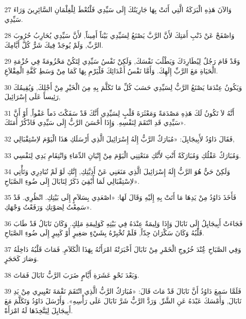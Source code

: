 \par 27 وَالآنَ هَذِهِ الْبَرَكَةُ الَّتِي أَتَتْ بِهَا جَارِيَتُكَ إِلَى سَيِّدِي فَلْتُعْطَ لِلْغِلْمَانِ السَّائِرِينَ وَرَاءَ سَيِّدِي.
\par 28 وَاصْفَحْ عَنْ ذَنْبِ أَمَتِكَ لأَنَّ الرَّبَّ يَصْنَعُ لِسَيِّدِي بَيْتاً أَمِيناً, لأَنَّ سَيِّدِي يُحَارِبُ حُرُوبَ الرَّبِّ, وَلَمْ يُوجَدْ فِيكَ شَرٌّ كُلَّ أَيَّامِكَ.
\par 29 وَقَدْ قَامَ رَجُلٌ لِيُطَارِدَكَ وَيَطْلُبَ نَفْسَكَ, وَلَكِنْ نَفْسُ سَيِّدِي لِتَكُنْ مَحْزُومَةً فِي حُزْمَةِ الْحَيَاةِ مَعَ الرَّبِّ إِلَهِكَ. وَأَمَّا نَفْسُ أَعْدَائِكَ فَلْيَرْمِ بِهَا كَمَا مِنْ وَسَطِ كَفَّةِ الْمِقْلاَعِ.
\par 30 وَيَكُونُ عِنْدَمَا يَصْنَعُ الرَّبُّ لِسَيِّدِي حَسَبَ كُلِّ مَا تَكَلَّمَ بِهِ مِنَ الْخَيْرِ مِنْ أَجْلِكَ, وَيُقِيمُكَ رَئِيساً عَلَى إِسْرَائِيلَ,
\par 31 أَنَّهُ لاَ تَكُونُ لَكَ هَذِهِ مَصْدَمَةً وَمَعْثَرَةَ قَلْبٍ لِسَيِّدِي أَنَّكَ قَدْ سَفَكْتَ دَماً عَفْواً, أَوْ أَنَّ سَيِّدِي قَدِ انْتَقَمَ لِنَفْسِهِ. وَإِذَا أَحْسَنَ الرَّبُّ إِلَى سَيِّدِي فَاذْكُرْ أَمَتَكَ».
\par 32 فَقَالَ دَاوُدُ لأَبِيجَايِلَ: «مُبَارَكٌ الرَّبُّ إِلَهُ إِسْرَائِيلَ الَّذِي أَرْسَلَكِ هَذَا الْيَوْمَ لاِسْتِقْبَالِي,
\par 33 وَمُبَارَكٌ عَقْلُكِ وَمُبَارَكَةٌ أَنْتِ لأَنَّكِ مَنَعْتِنِي الْيَوْمَ مِنْ إِتْيَانِ الدِّمَاءِ وَانْتِقَامِ يَدِي لِنَفْسِي.
\par 34 وَلَكِنْ حَيٌّ هُوَ الرَّبُّ إِلَهُ إِسْرَائِيلَ الَّذِي مَنَعَنِي عَنْ أَذِيَّتِكِ, إِنَّكِ لَوْ لَمْ تُبَادِرِي وَتَأْتِي لاِسْتِقْبَالِي لَمَا أُبْقِيَ ذَكَرٌ لِنَابَالَ إِلَى ضُوءِ الصَّبَاحِ».
\par 35 فَأَخَذَ دَاوُدُ مِنْ يَدِهَا مَا أَتَتْ بِهِ إِلَيْهِ وَقَالَ لَهَا: «اصْعَدِي بِسَلاَمٍ إِلَى بَيْتِكِ. انْظُرِي. قَدْ سَمِعْتُ لِصَوْتِكِ وَرَفَعْتُ وَجْهَكِ».
\par 36 فَجَاءَتْ أَبِيجَايِلُ إِلَى نَابَالَ وَإِذَا وَلِيمَةٌ عِنْدَهُ فِي بَيْتِهِ كَوَلِيمَةِ مَلِكٍ. وَكَانَ نَابَالُ قَدْ طَابَ قَلْبُهُ وَكَانَ سَكْرَانَ جِدّاً, فَلَمْ تُخْبِرْهُ بِشَيْءٍ صَغِيرٍ أَوْ كَبِيرٍ إِلَى ضُوءِ الصَّبَاحِ.
\par 37 وَفِي الصَّبَاحِ عَُِنْدَ خُرُوجِ الْخَمْرِ مِنْ نَابَالَ أَخْبَرَتْهُ امْرَأَتُهُ بِهَذَا الْكَلاَمِ, فَمَاتَ قَلْبُهُ دَاخِلَهُ وَصَارَ كَحَجَرٍ.
\par 38 وَبَعْدَ نَحْوِ عَشَرَةِ أَيَّامٍ ضَرَبَ الرَّبُّ نَابَالَ فَمَاتَ.
\par 39 فَلَمَّا سَمِعَ دَاوُدُ أَنَّ نَابَالَ قَدْ مَاتَ قَالَ: «مُبَارَكٌ الرَّبُّ الَّذِي انْتَقَمَ نَقْمَةَ تَعْيِيرِي مِنْ يَدِ نَابَالَ, وَأَمْسَكَ عَبْدَهُ عَنِ الشَّرِّ, وَرَدَّ الرَّبُّ شَرَّ نَابَالَ عَلَى رَأْسِهِ». وَأَرْسَلَ دَاوُدُ وَتَكَلَّمَ مَعَ أَبِيجَايِلَ لِيَتَّخِذَهَا لَهُ امْرَأَةً.
